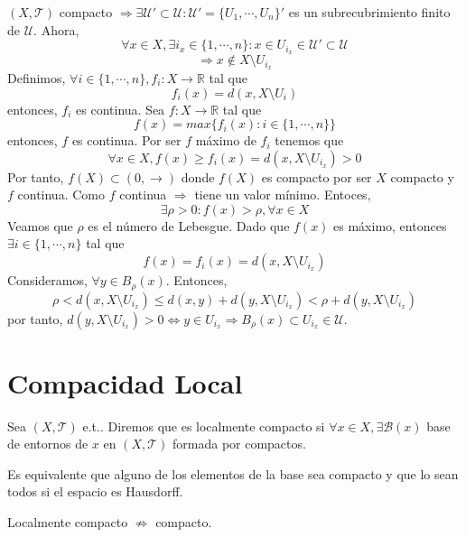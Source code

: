 \begin{dem}
  $( X, \mathcal{T} )$ compacto $\Rightarrow \exists \mathcal{U}' \subset \mathcal{U} : \mathcal{U}' = \{ U_{1}, \cdots, U_{n} \}'$ es un subrecubrimiento finito de $\mathcal{U}$. Ahora,
  \[ 
    \forall x \in X, \exists i_{x} \in \{ 1, \cdots, n \} : x \in U_{i_{x}} \in \mathcal{U}' \subset \mathcal{U}
  \]  
  \[ 
    \Rightarrow x \not \in X \setminus U_{i_{x}} 
  \] 
  Definimos, $\forall i \in \{ 1, \cdots, n \}, f_{i} :  X \to \mathbb{R}$ tal que
  \[
    f_{i}(x) = d(x, X \setminus U_{i})
  \]
  entonces, $f_{i}$ es continua. Sea $f : X \to \mathbb{R}$ tal que 
  \[ 
    f(x) = max \{ f_{i}(x) : i \in \{ 1, \cdots, n \} \} 
  \] 
  entonces, $f$ es continua. Por ser $f$ máximo de $f_{i}$ tenemos que
  \[ 
    \forall x \in X, f(x) \geq f_{i}(x) = d(x, X \setminus U_{i_{x}})  > 0
  \] 
  Por tanto, $f(X) \subset (0, \rightarrow)$ donde $f(X)$ es compacto por ser $X$ compacto y $f$ continua. Como $f$ continua $\Rightarrow$ tiene un valor mínimo. Entoces,
  \[ 
    \exists \rho > 0 : f(x) > \rho, \forall x \in X 
  \] 
  Veamos que $\rho$ es el número de Lebesgue. Dado que $f(x)$ es máximo, entonces $\exists i \in \{ 1, \cdots, n \}$ tal que
  \[ 
    f(x) = f_{i}(x) = d(x, X \setminus U_{i_{x}}) 
  \] 
  Consideramos, $\forall y \in B_{\rho}(x)$. Entonces,
  \[ 
    \rho < d(x, X \setminus U_{i_{x}}) \leq d(x, y) + d(y, X \setminus U_{i_{x}}) < \rho + d(y, X \setminus U_{i_{x}}) 
  \] 
  por tanto, $d(y, X \setminus U_{i_{x}}) > 0 \Leftrightarrow y \in U_{i_{x}} \Rightarrow B_{\rho}(x) \subset U_{i_{x}} \in \mathcal{U}$.
\end{dem}

\section{Compacidad Local}

\begin{defn}
  Sea $( X, \mathcal{T} )$ e.t.. Diremos que es localmente compacto si $\forall x \in X, \exists \mathcal{B}(x)$ base de entornos de $x$ en $( X, \mathcal{T} )$ formada por compactos.
\end{defn}

\begin{obs}
  Es equivalente que alguno de los elementos de la base sea compacto y que lo sean todos si el espacio es Hausdorff.
\end{obs}

\begin{obs}
  Localmente compacto $\not \Rightarrow$ compacto.
\end{obs}

